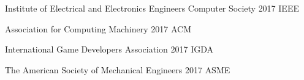 
\begin{cvhonors}
	
	\cvhonor
	{Institute of Electrical and Electronics Engineers} %
	{Computer Society} %
	{2017} %
	{IEEE} %
	
	\cvhonor
	{Association for Computing Machinery} %
	{} %
	{2017} %
	{ACM} %
	
	\cvhonor
	{International Game Developers Association} %
	{} %
	{2017} %
	{IGDA} %
	
	\cvhonor
	{The American Society of Mechanical Engineers} %
	{} %
	{2017} %
	{ASME} %
	
	
\end{cvhonors}